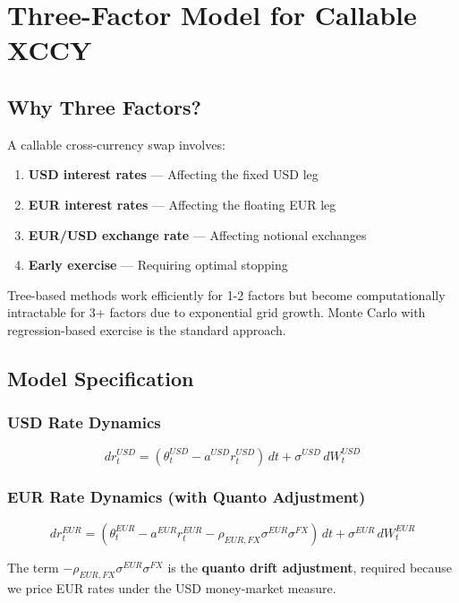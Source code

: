 \documentclass[10pt,a4paper]{article}
\begin{document}
\newpage

\section{Three-Factor Model for Callable XCCY}

\subsection{Why Three Factors?}

A callable cross-currency swap involves:
\begin{enumerate}
    \item \textbf{USD interest rates} --- Affecting the fixed USD leg
    \item \textbf{EUR interest rates} --- Affecting the floating EUR leg
    \item \textbf{EUR/USD exchange rate} --- Affecting notional exchanges
    \item \textbf{Early exercise} --- Requiring optimal stopping
\end{enumerate}

Tree-based methods work efficiently for 1-2 factors but become computationally intractable for 3+ factors due to exponential grid growth. Monte Carlo with regression-based exercise is the standard approach.

\subsection{Model Specification}

\subsubsection{USD Rate Dynamics}
\[
dr_t^{USD} = (\theta_t^{USD} - a^{USD} r_t^{USD})\,dt + \sigma^{USD}\,dW_t^{USD}
\]

\subsubsection{EUR Rate Dynamics (with Quanto Adjustment)}
\[
dr_t^{EUR} = (\theta_t^{EUR} - a^{EUR} r_t^{EUR} - \rho_{EUR,FX}\sigma^{EUR}\sigma^{FX})\,dt + \sigma^{EUR}\,dW_t^{EUR}
\]

The term $-\rho_{EUR,FX}\sigma^{EUR}\sigma^{FX}$ is the \textbf{quanto drift adjustment}, required because we price EUR rates under the USD money-market measure.
\end{document}
